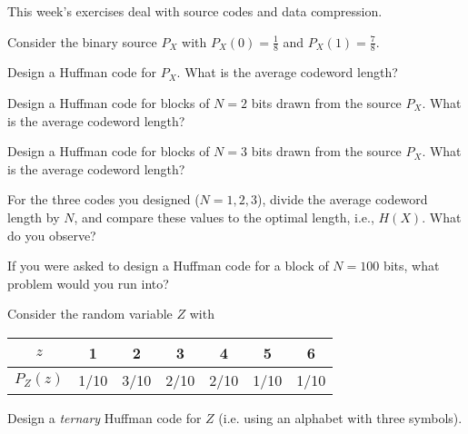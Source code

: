 \documentclass[a4paper,10pt,landscape,twocolumn]{scrartcl}
\begin{document}
\practiceproblems

{\sffamily\noindent
This week's exercises deal with source codes and data compression. \practiceinstructions
}

\setcounter{exCount}{-1}
\begin{exercise}
	Consider the binary source $P_X$ with $P_X(0) = \frac{1}{8}$ and $P_X(1) = \frac{7}{8}$.

\begin{subex}
	Design a Huffman code for $P_X$. What is the average codeword length?
\end{subex}

\begin{subex}
	Design a Huffman code for blocks of $N=2$ bits drawn from the source $P_X$. What is the average codeword length?
\end{subex}

\begin{subex}
	Design a Huffman code for blocks of $N=3$ bits drawn from the source $P_X$. What is the average codeword length?
\end{subex}

\begin{subex}
	For the three codes you designed ($N=1,2,3$), divide the average codeword length by $N$, and compare these values to the optimal length, i.e., $H(X)$. What do you observe?
\end{subex}

\begin{subex}
	If you were asked to design a Huffman code for a block of $N = 100$ bits, what problem would you run into?
\end{subex}

\begin{subex}
	Consider the random variable $Z$ with
	\begin{center}
		\begin{tabular}{c | c c c c c c}
			$z$ & 1 & 2 & 3 & 4 & 5 & 6\\
			\hline
			$P_Z(z)$ & 1/10 & 3/10 & 2/10 & 2/10 & 1/10 & 1/10\\
		\end{tabular}
	\end{center}
	Design a \emph{ternary} Huffman code for $Z$ (i.e. using an alphabet with three symbols).
\end{subex}

\end{exercise}
\end{document}
